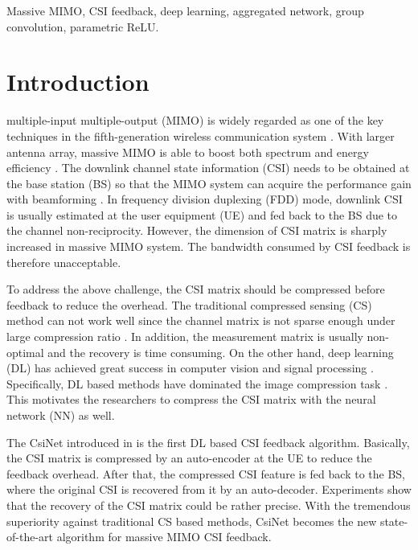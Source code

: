 \documentclass[12pt, draftclsnofoot, onecolumn]{IEEEtran}
\begin{document}
\newpage
\begin{IEEEkeywords}
Massive MIMO, CSI feedback, deep learning, aggregated network, group convolution, parametric ReLU.
\end{IEEEkeywords}


\IEEEpeerreviewmaketitle


\section{Introduction} \label{Section1}

 multiple-input multiple-output (MIMO) is widely regarded as one of the key techniques in the fifth-generation wireless communication system \cite{boccardi2014five}. With larger antenna array, massive MIMO is able to boost both spectrum and energy efficiency \cite{lu2014overview}. The downlink channel state information (CSI) needs to be obtained at the base station (BS) so that the MIMO system can acquire the performance gain with beamforming \cite{molisch2017hybrid}. In frequency division duplexing (FDD) mode, downlink CSI is usually estimated at the user equipment (UE) and fed back to the BS due to the channel non-reciprocity. However, the dimension of CSI matrix is sharply increased in massive MIMO system. The bandwidth consumed by CSI feedback is therefore unacceptable.

To address the above challenge, the CSI matrix should be compressed before feedback to reduce the overhead. The traditional compressed sensing (CS) method can not work well since the channel matrix is not sparse enough under large compression ratio \cite{wen2018deep}. In addition, the measurement matrix is usually non-optimal and the recovery is time consuming. On the other hand, deep learning (DL) has achieved great success in computer vision and signal processing \cite{lecun2015deep, voulodimos2018deep, young2018recent}. Specifically, DL based methods have dominated the image compression task \cite{toderici2017full, li2018learning}. This motivates the researchers to compress the CSI matrix with the neural network (NN) as well.

The CsiNet introduced in \cite{wen2018deep} is the first DL based CSI feedback algorithm. Basically, the CSI matrix is compressed by an auto-encoder at the UE to reduce the feedback overhead. After that, the compressed CSI feature is fed back to the BS, where the original CSI is recovered from it by an auto-decoder. Experiments show that the recovery of the CSI matrix could be rather precise. With the tremendous superiority against traditional CS based methods, CsiNet becomes the new state-of-the-art algorithm for massive MIMO CSI feedback.
\end{document}
